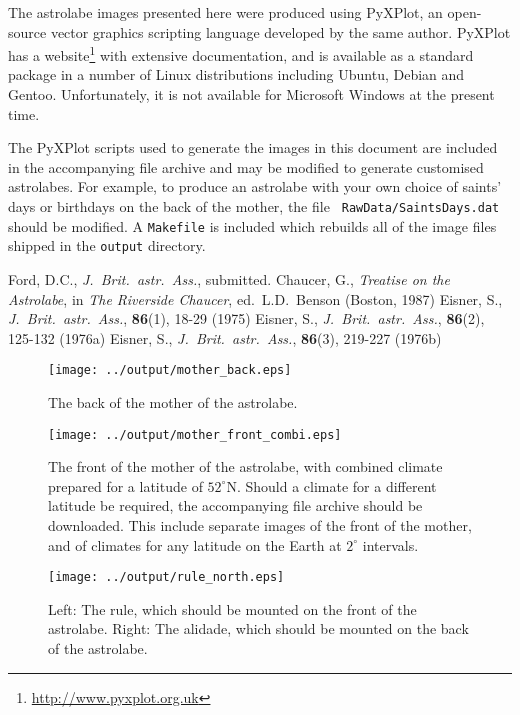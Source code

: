 \documentclass[a4paper,onecolumn,10pt]{article}
\begin{document}
The astrolabe images presented here were produced using PyXPlot, an open-source
vector graphics scripting language developed by the same author.  PyXPlot has a
website\footnote{\url{http://www.pyxplot.org.uk}} with extensive documentation,
and is available as a standard package in a number of Linux distributions
including Ubuntu, Debian and Gentoo. Unfortunately, it is not available for
Microsoft Windows at the present time.

The PyXPlot scripts used to generate the images in this document are included
in the accompanying file archive and may be modified to generate customised
astrolabes. For example, to produce an astrolabe with your own choice of
saints' days or birthdays on the back of the mother, the file {\tt
Raw\-Data/\-Saints\-Days\-.dat} should be modified. A {\tt Makefile} is
included which rebuilds all of the image files shipped in the {\tt output}
directory.

\begin{thebibliography}{9}
Ford, D.C., \textit{J.\ Brit.\ astr.\ Ass.}, submitted.
Chaucer, G., \textit{Treatise on the Astrolabe}, in {\it The Riverside Chaucer}, ed.\ L.D.\ Benson (Boston, 1987)
Eisner, S., \textit{J.\ Brit.\ astr.\ Ass.}, \textbf{86}(1), 18-29 (1975)
Eisner, S., \textit{J.\ Brit.\ astr.\ Ass.}, \textbf{86}(2), 125-132 (1976a)
Eisner, S., \textit{J.\ Brit.\ astr.\ Ass.}, \textbf{86}(3), 219-227 (1976b)
\end{thebibliography}

\newpage

\begin{figure}
\centerline{\texttt{[image: ../output/mother\_back.eps]}}
\caption{The back of the mother of the astrolabe.}
\label{mother_back}
\end{figure}

\begin{figure}
\centerline{\texttt{[image: ../output/mother\_front\_combi.eps]}}
\caption{The front of the mother of the astrolabe, with combined climate prepared for a latitude of $52^\circ$N. Should a climate for a different latitude be required, the accompanying file archive should be downloaded. This include separate images of the front of the mother, and of climates for any latitude on the Earth at $2^\circ$ intervals.}
\label{mother_front}
\end{figure}

\begin{figure}
\centerline{\texttt{[image: ../output/rule\_north.eps]}}
\caption{Left: The rule, which should be mounted on the front of the astrolabe. Right: The alidade, which should be mounted on the back of the astrolabe.}
\label{rule}
\end{figure}
\end{document}
